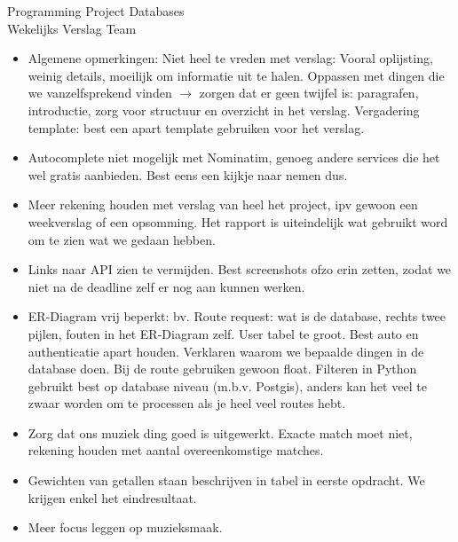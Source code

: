 \documentclass{article}
\newcounter{team}
\begin{document}
\begin{Minutes}{Programming Project Databases \\ Wekelijks Verslag Team }
            \begin{itemize}
                \item Algemene opmerkingen: Niet heel te vreden met verslag: Vooral oplijsting, weinig details, moeilijk om informatie uit te halen. Oppassen met dingen die we vanzelfsprekend vinden $\rightarrow$ zorgen dat er geen twijfel is: paragrafen, introductie, zorg voor structuur en overzicht in het verslag. Vergadering template: best een apart template gebruiken voor het verslag.
                \item Autocomplete niet mogelijk met Nominatim, genoeg andere services die het wel gratis aanbieden. Best eens een kijkje naar nemen dus.
                \item Meer rekening houden met verslag van heel het project, ipv gewoon een weekverslag of een opsomming. Het rapport is uiteindelijk wat gebruikt word om te zien wat we gedaan hebben.
                \item Links naar API zien te vermijden. Best screenshots ofzo erin zetten, zodat we niet na de deadline zelf er nog aan kunnen werken.
                \item ER-Diagram vrij beperkt: bv. Route request: wat is de database, rechts twee pijlen, fouten in het ER-Diagram zelf. User tabel te groot. Best auto en authenticatie apart houden. Verklaren waarom we bepaalde dingen in de database doen. Bij de route gebruiken gewoon float. Filteren in Python gebruikt best op database niveau (m.b.v. Postgis), anders kan het veel te zwaar worden om te processen als je heel veel routes hebt.
                \item Zorg dat ons muziek ding goed is uitgewerkt. Exacte match moet niet, rekening houden met aantal overeenkomstige matches.
                \item Gewichten van getallen staan beschrijven in tabel in eerste opdracht. We krijgen enkel het eindresultaat.
                \item Meer focus leggen op muzieksmaak.
            \end{itemize}




\end{Minutes}
\end{document}
